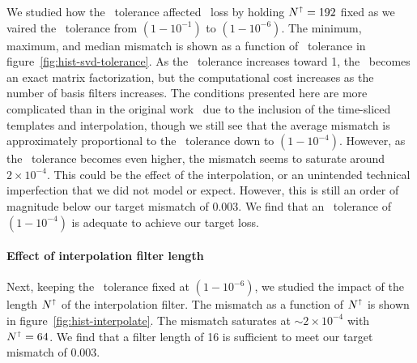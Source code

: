 We studied how the \SVD\ tolerance affected \SNR\ loss by holding
$N^\shortuparrow = 192$ fixed as we vaired the \SVD\ tolerance from
$\left(1-10^{-1}\right)$ to $\left(1-10^{-6}\right)$.  The minimum, maximum, and median
mismatch is shown as a function of \SVD\ tolerance in
figure~\ref{fig:hist-svd-tolerance}.  As the \SVD\ tolerance increases toward 1, the
\SVD\ becomes an exact matrix factorization, but the computational cost increases as
the number of basis filters increases.  The conditions presented here are more
complicated than in the original work~\citep{Cannon:2010p10398} due to the inclusion
of the time-sliced templates and interpolation, though we still see that the average
mismatch is approximately proportional to the \SVD\ tolerance down to
$\left(1-10^{-4}\right)$.  However, as the \SVD\ tolerance becomes even higher, the
mismatch seems to saturate around $2 \times 10^{-4}$.  This could be the effect of the
interpolation, or an unintended technical imperfection that we did not model or expect.
However, this is still an order of magnitude below our target mismatch of 0.003.  We
find that an \SVD\ tolerance of $\left(1-10^{-4}\right)$ is adequate to achieve our
target \SNR{} loss.

\paragraph{Effect of interpolation filter length}

Next, keeping the \SVD\ tolerance fixed at $\left(1-10^{-6}\right)$, we studied the
impact of the length $N^\shortuparrow$ of the interpolation filter.  The mismatch as
a function of $N^\shortuparrow$ is shown in figure~\ref{fig:hist-interpolate}.  The
mismatch saturates at $\sim 2 \times 10^{-4}$ with $N^\shortuparrow = 64$.  We find
that a filter length of 16 is sufficient to meet our target mismatch of 0.003.

